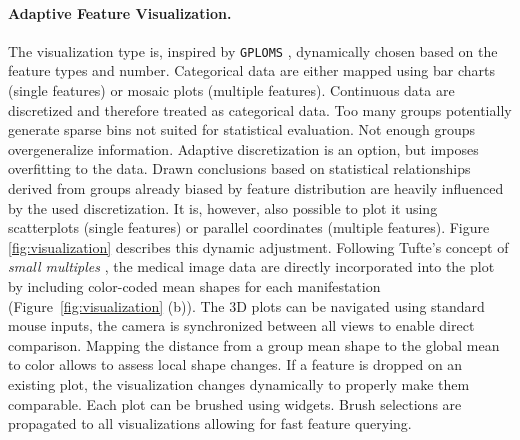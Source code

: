 \documentclass[journal]{style/vgtc} 			          %
\begin{document}
\paragraph{Adaptive Feature Visualization.} \label{sec:AdaptiveFeatureVisualization}
The visualization type is, inspired by \texttt{GPLOMS} \cite{Francois2013}, dynamically chosen based on the feature types and number.
%
Categorical data are either mapped using bar charts (single features) or mosaic plots (multiple features).
%
Continuous data are discretized and therefore treated as categorical data.
%
Too many groups potentially generate sparse bins not suited for statistical evaluation. 
%
Not enough groups overgeneralize information.
%
Adaptive discretization is an option, but imposes overfitting to the data.
%
Drawn conclusions based on statistical relationships derived from groups already biased by feature distribution are heavily influenced by the used discretization.
%
It is, however, also possible to plot it using scatterplots (single features) or parallel coordinates (multiple features).
%
Figure \ref{fig:visualization} describes this dynamic adjustment.
%
Following Tufte's concept of \emph{small multiples} \cite{Tufte1983}, the medical image data are directly incorporated into the plot by including color-coded mean shapes for each manifestation (Figure~\ref{fig:visualization} (b)).
%
The 3D plots can be navigated using standard mouse inputs, the camera is synchronized between all views to enable direct comparison.
%
Mapping the distance from a group mean shape to the global mean to color allows to assess local shape changes.
If a feature is dropped on an existing plot, the visualization changes dynamically to properly make them comparable. 
%
Each plot can be brushed using widgets.
%
Brush selections are propagated to all visualizations allowing for fast feature querying.
%
%
\end{document}
